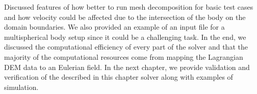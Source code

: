 Discussed features of how better to run mesh decomposition for basic test cases and how velocity could be affected due to the intersection of the body on the domain boundaries. We also provided an example of an input file for a multispherical body setup since it could be a challenging task. In the end, we discussed the computational efficiency of every part of the solver and that the majority of the computational resources come from mapping the Lagrangian DEM data to an Eulerian field. In the next chapter, we provide validation and verification of the described in this chapter solver along with examples of simulation. 
